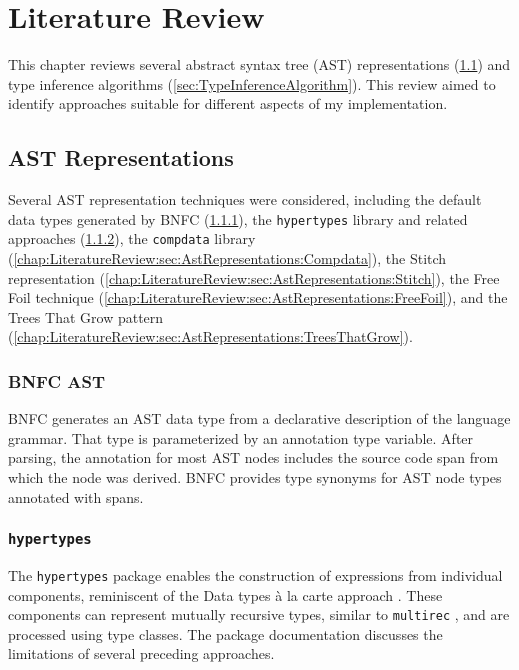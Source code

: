 \chapter{Literature Review}
\label{chap:LiteratureReview}

This chapter reviews several abstract syntax tree (AST) representations (\cref{sec:AstRepresentations}) and type inference algorithms (\cref{sec:TypeInferenceAlgorithm}). This review aimed to identify approaches suitable for different aspects of my implementation.

\section{AST Representations}
\label{sec:AstRepresentations}

Several AST representation techniques were considered, including the default data types generated by BNFC (\cref{chap:LiteratureReview:sec:AstRepresentations:BnfcAst}), the \texttt{hypertypes} library and related approaches (\cref{chap:LiteratureReview:sec:AstRepresentations:Hypertypes}), the \texttt{compdata} library (\cref{chap:LiteratureReview:sec:AstRepresentations:Compdata}), the Stitch representation (\cref{chap:LiteratureReview:sec:AstRepresentations:Stitch}), the Free Foil technique (\cref{chap:LiteratureReview:sec:AstRepresentations:FreeFoil}), and the Trees That Grow pattern (\cref{chap:LiteratureReview:sec:AstRepresentations:TreesThatGrow}).


\subsection{BNFC AST}
\label{chap:LiteratureReview:sec:AstRepresentations:BnfcAst}

BNFC \cite{bnfc-site-2025} generates an AST data type from a declarative description of the language grammar. That type is parameterized by an annotation type variable. After parsing, the annotation for most AST nodes includes the source code span from which the node was derived. BNFC provides type synonyms for AST node types annotated with spans.

\subsection{\texttt{hypertypes}}
\label{chap:LiteratureReview:sec:AstRepresentations:Hypertypes}

The \texttt{hypertypes} package \cite{hypertypes-hackage} enables the construction of expressions from individual components, reminiscent of the Data types à la carte approach \cite{swierstra-data-2008}. These components can represent mutually recursive types, similar to \texttt{multirec} \cite{multirec-hackage}, and are processed using type classes. The package documentation discusses the limitations of several preceding approaches.

